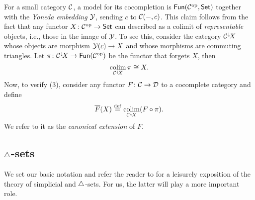 For a small category $\mathcal{C}$, a model for its cocompletion is $\mathsf{Fun}(\mathcal{C}^{\mathrm{op}}, \mathsf{Set})$ together with the \textit{Yoneda embedding} $\operatorname{\mathcal{Y}}$, sending $c$ to $\mathcal{C}(-,c)$.
This claim follows from the fact that any functor $X \colon \mathcal{C}^{\mathrm{op}} \to \mathsf{Set}$ can described as a colimit of \textit{representable} objects, i.e., those in the image of $\operatorname{\mathcal{Y}}$.
To see this, consider the category $\mathcal{C}^\downarrow\hspace{-2pt}X$ whose objects are morphism $\operatorname{\mathcal{Y}}(c) \to X$ and whose morphisms are commuting triangles.
Let $\pi \colon \mathcal{C}^\downarrow\hspace{-2pt}X \to \mathsf{Fun}(\mathcal{C}^{\mathrm{op}})$ be the functor that forgets $X$, then
\[
\operatorname*{colim}_{\mathcal{C}^\downarrow\hspace{-1.5pt}X} \pi \cong X.
\]
Now, to verify (3), consider any functor $F \colon \mathcal{C} \to \mathcal{D}$ to a cocomplete category and define
\[
\overline{F}(X) \stackrel{\mathrm{def}}{=} \operatorname*{colim}_{\mathcal{C}^\downarrow\hspace{-1.5pt}X} (F \circ \pi).
\]
We refer to it as the \textit{canonical extension} of $F$.

\subsection{$\triangle$-sets}

We set our basic notation and refer the reader to \cite{friedman2021simplicial} for a leisurely exposition of the theory of simplicial and $\triangle$-sets.
For us, the latter will play a more important role.

